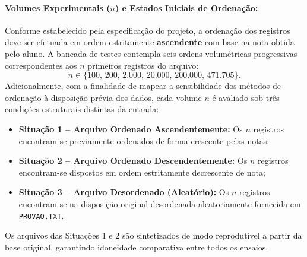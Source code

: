 \documentclass[12pt,a4paper]{article}
\begin{document}
\paragraph{Volumes Experimentais ($n$) e Estados Iniciais de Ordenação:}
Conforme estabelecido pela especificação do projeto, a ordenação dos registros deve ser efetuada em ordem estritamente \textbf{ascendente} com base na nota obtida pelo aluno. A bancada de testes contempla seis ordens volumétricas progressivas correspondentes aos $n$ primeiros registros do arquivo:
\begin{equation}
    n \in \{100, \, 200, \, 2.000, \, 20.000, \, 200.000, \, 471.705\}.
\end{equation}
Adicionalmente, com a finalidade de mapear a sensibilidade dos métodos de ordenação à disposição prévia dos dados, cada volume $n$ é avaliado sob três condições estruturais distintas da entrada:
\begin{itemize}
    \item \textbf{Situação 1 -- Arquivo Ordenado Ascendentemente:} Os $n$ registros encontram-se previamente ordenados de forma crescente pelas notas;
    \item \textbf{Situação 2 -- Arquivo Ordenado Descendentemente:} Os $n$ registros encontram-se dispostos em ordem estritamente decrescente de nota;
    \item \textbf{Situação 3 -- Arquivo Desordenado (Aleatório):} Os $n$ registros encontram-se na disposição original desordenada aleatoriamente fornecida em \texttt{PROVAO.TXT}.
\end{itemize}
Os arquivos das Situações 1 e 2 são sintetizados de modo reprodutível a partir da base original, garantindo idoneidade comparativa entre todos os ensaios.
\end{document}
